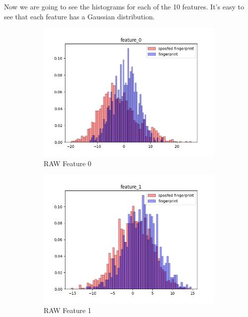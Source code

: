 \documentclass[english]{report}
\begin{document}
Now we are going to see the histograms for each of the 10 features. It's easy to see that
each feature has a Gaussian distribution. \newline
\begin{figure}[h!]
    \begin{subfigure}{0.3\textwidth}
        \includegraphics[scale=0.3]{../../images/feature_plot/hist_feature_0}
        \caption{RAW Feature 0}
    \end{subfigure}
    \begin{subfigure}{0.3\textwidth}
        \includegraphics[scale=0.3]{../../images/feature_plot/hist_feature_1}
        \caption{RAW Feature 1}
    \end{subfigure}
    \begin{subfigure}{0.3\textwidth}

\end{subfigure}
\end{figure}
\end{document}
